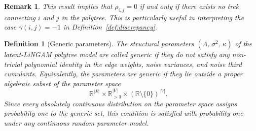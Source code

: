 \documentclass[11pt,a4paper]{article}
\numberwithin{equation}{section}
\newtheorem{definition}[theorem]{Definition}
\newtheorem{remark}[theorem]{Remark}
\begin{document}
\begin{remark}
This result implies that $\rho_{i,j} = 0$ if and only if there exists no trek connecting $i$ and $j$ in the polytree. This is particularly useful in interpreting the case $\gamma(i,j) = -1$ in Definition~\ref{def:discrepancy}.
\end{remark}

\begin{definition}[Generic parameters]\label{def:generic}
The structural parameters $(\Lambda,\,\sigma^2,\,\kappa)$ of the
latent-LiNGAM polytree model are called \emph{generic} if they do not
satisfy any non-trivial polynomial identity in the edge weights, noise
variances, and noise third cumulants.  Equivalently, the parameters are
generic if they lie outside a proper algebraic subset of the parameter space
\[
  \mathbb{R}^{|E|}
  \times\mathbb{R}_{>0}^{|V|}
  \times(\mathbb{R}\setminus\{0\})^{|V|}.
\]
Since every absolutely continuous distribution on the parameter space
assigns probability one to the generic set, this condition is satisfied
with probability one under any continuous random parameter model.
\end{definition}
\end{document}
